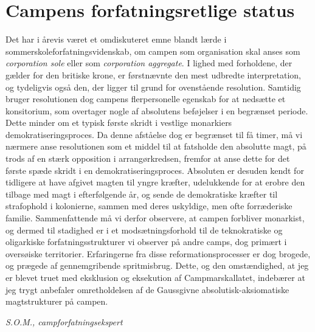 \begin{minipage}[t]{100mm}
\vspace{1mm}
\section*{Campens forfatningsretlige status}
Det har i årevis været et omdiskuteret emne blandt lærde i sommerskoleforfatningsvidenskab, om campen som organisation skal anses som \emph{corporation sole} eller som \emph{corporation aggregate}. I lighed med forholdene, der gælder for den britiske krone, er førstnævnte den mest udbredte interpretation, og tydeligvis også den, der ligger til grund for ovenstående resolution. Samtidig bruger resolutionen dog campens flerpersonelle egenskab for at nedsætte et konsitorium, som overtager nogle af absolutens beføjelser i en begrænset periode. Dette minder om et typisk første skridt i vestlige monarkiers demokratiseringsproces. Da denne afståelse dog er begrænset til få timer, må vi nærmere anse resolutionen som et middel til at fatsholde den absolutte magt, på trods af en stærk opposition i arrangørkredsen, fremfor at anse dette for det første spæde skridt i en demokratiseringsproces. Absoluten er desuden kendt for tidligere at have afgivet magten til yngre kræfter, udelukkende for at erobre den tilbage med magt i efterfølgende år, og sende de demokratiske kræfter til strafophold i kolonierne, sammen med deres uskyldige, men ofte forræderiske familie. Sammenfattende må vi derfor observere, at campen forbliver monarkist, og dermed til stadighed er i et modsætningsforhold til de teknokratiske og oligarkiske forfatningsstrukturer vi observer på andre camps, dog primært i oversøiske territorier. Erfaringerne fra disse reformationsprocesser er dog brogede, og prægede af gennemgribende spritmisbrug.  Dette, og den omstændighed, at jeg er blevet truet med eksklusion og eksekution af Campmarskallatet, indebærer at jeg trygt anbefaler omretholdelsen af de Gaussgivne absolutisk-aksiomatiske magtstrukturer på campen.

{\flushright\emph{S.O.M., campforfatningsekspert}}


\end{minipage}
